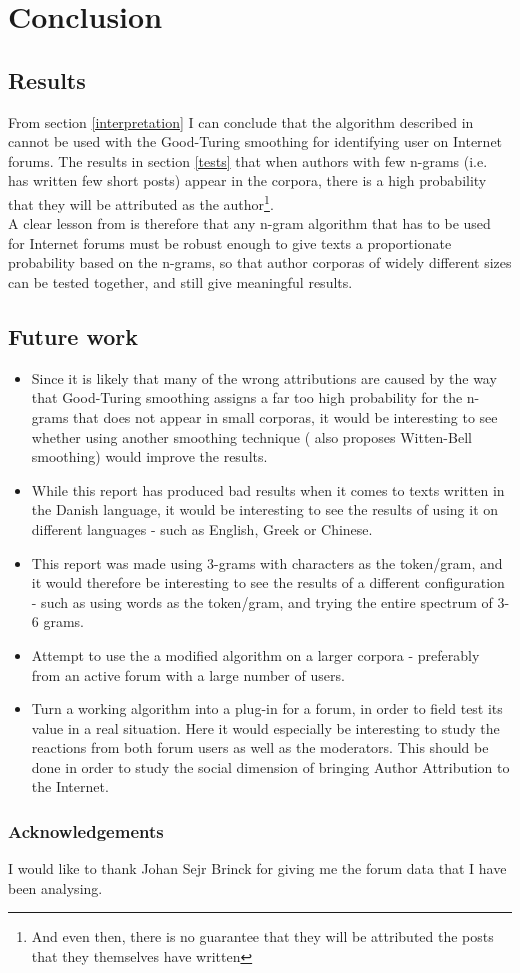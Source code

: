 \section{Conclusion}
\label{conclusion}

\subsection{Results}
From section \ref{interpretation} I can conclude that the algorithm described in \cite{nr4} cannot be used with the Good-Turing smoothing for identifying user on Internet forums. The results in section \ref{tests} that when authors with few n-grams (i.e. has written few short posts) appear in the corpora, there is a high probability that they will be attributed as the author\footnote{And even then, there is no guarantee that they will be attributed the posts that they themselves have written}.\\

A clear lesson from \cite{nr4} is therefore that any n-gram algorithm that has to be used for Internet forums must be robust enough to give texts a proportionate probability based on the n-grams, so that author corporas of widely different sizes can be tested together, and still give meaningful results. 

\subsection{Future work}

\begin{itemize}
\item Since it is likely that many of the wrong attributions are caused by the way that Good-Turing smoothing assigns a far too high probability for the n-grams that does not appear in small corporas, it would be interesting to see whether using another smoothing technique (\cite{nr4} also proposes Witten-Bell smoothing) would improve the results.

\item While this report has produced bad results when it comes to texts written in the Danish language, it would be interesting to see the results of using it on different languages - such as English, Greek or Chinese.

\item This report was made using 3-grams with characters as the token/gram, and it would therefore be interesting to see the results of a different configuration - such as using words as the token/gram, and trying the entire spectrum of 3-6 grams. 

\item Attempt to use the a modified algorithm on a larger corpora - preferably from an active forum with a large number of users. 

\item Turn a working algorithm into a plug-in for a forum, in order to field test its value in a real situation. Here it would especially be interesting to study the reactions from both forum users as well as the moderators. This should be done in order to study the social dimension of bringing Author Attribution to the Internet.
\end{itemize}  

\subsubsection*{Acknowledgements}
I would like to thank Johan Sejr Brinck for giving me the forum data that I have been analysing.
